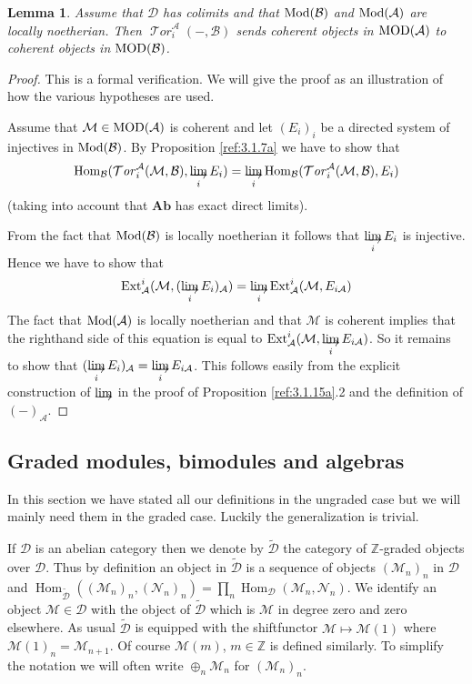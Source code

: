 \documentclass{amsproc}
\def \ZZ{{\mathbb Z}}
\def\Ascr{{\mathcal A}}
\def\Bscr{{\mathcal B}}
\def\Dscr{{\mathcal D}}
\def\Mscr{{\mathcal M}}
\def\Nscr{{\mathcal N}}
\def\Tscr{{\mathcal T}}
\def\HTor{\operatorname {\Tscr \mathit{or}}}
\def\Ab{\mathbf{Ab}}
\def\Mod{\mathop{\text{Mod}}}
\def\MOD{\mathop{\text{MOD}}}
\def\Ext{\operatorname {Ext}}
\def\Hom{\operatorname {Hom}}
\def\HTor{\operatorname {\Tscr \mathit{or}}}
\let\oldtext\text
\def\text#1{\oldtext{\upshape #1}}
\newtheorem{lemmas}{Lemma}[subsection]
\theoremstyle{definition}
\theoremstyle{remark}
\def\dirlim{\mathop{\vtop{\baselineskip -100pt\lineskip -1pt\lineskiplimit 0pt
\setbox0\hbox{\upshape lim}\copy0\hbox to \wd0{\rightarrowfill}}}\limits}
\numberwithin{equation}{section}
\numberwithin{table}{section}
\numberwithin{figure}{section}
\begin{document}
\begin{lemmas}
\label{ref:3.1.17a}
Assume that $\Dscr$ has colimits and that $\Mod(\Bscr)$ and $\Mod(\Ascr)$
are locally noetherian. Then $\HTor_i^\Ascr(-,\Bscr)$ sends coherent
objects in $\MOD(\Ascr)$ to  coherent objects in $\MOD(\Bscr)$.
\end{lemmas}
\begin{proof} This is a formal verification. We will give the proof as an
illustration of how the various hypotheses are used.

Assume that $\Mscr\in\MOD(\Ascr)$ is coherent and let $(E_i)_i$ be a
directed system of injectives in $\Mod(\Bscr)$. By Proposition
\ref{ref:3.1.7a} we have to show that
\[
\Hom_\Bscr(\HTor_i^\Ascr(\Mscr,\Bscr),\dirlim_i E_i)
=
\dirlim_i \Hom_\Bscr(\HTor_i^\Ascr(\Mscr,\Bscr),E_i)
\]
(taking into account that $\Ab$ has exact direct limits). 

From the fact that $\Mod(\Bscr)$ is locally noetherian it follows
that $\dirlim_i E_i$ is injective. Hence we have to show that 
\[
\Ext^i_\Ascr(\Mscr,(\dirlim_i E_i)_\Ascr)=
\dirlim_i \Ext^i_\Ascr(\Mscr,E_{i\Ascr})
\]
The fact that $\Mod(\Ascr)$ is locally noetherian and that $\Mscr$ is
coherent implies that the
righthand side of this equation is equal to 
$ \Ext^i_\Ascr(\Mscr,\dirlim_i E_{i\Ascr})$. So it remains to show that
$(\dirlim_i E_i)_\Ascr=\dirlim_i E_{i\Ascr}$.  This follows easily from
the explicit construction of $\dirlim$ in the proof of Proposition
\ref{ref:3.1.15a}.2 and the definition of $(-)_\Ascr$.
\end{proof}


\subsection{Graded modules, bimodules and algebras}
\label{ref:3.2b}
In this section we have stated all our definitions in the ungraded
case but we will mainly need them in the graded case. Luckily the
generalization is trivial.

If $\Dscr$ is an abelian category then we denote by $\tilde{\Dscr}$
the category of $\ZZ$-graded objects over $\Dscr$. Thus by definition
an object in $\tilde{\Dscr}$ is  a sequence of objects
$(\Mscr_n)_n$ in $\Dscr$ and
$\Hom_{\tilde{\Dscr}}((\Mscr_n)_n,(\Nscr_n)_n)=
\prod_n\Hom_\Dscr(\Mscr_n,\Nscr_n)$.
We identify an object $\Mscr\in\Dscr$ with the object of
$\tilde{\Dscr}$ which is $\Mscr$ in degree zero and zero elsewhere. As
usual $\tilde{\Dscr}$ is equipped with the shiftfunctor $\Mscr\mapsto
\Mscr(1)$ where $\Mscr(1)_n=\Mscr_{n+1}$.
Of course $\Mscr(m)$, $m\in\ZZ$ is defined similarly. To simplify the
notation we will often write $\oplus_n\Mscr_n$ for $(\Mscr_n)_n$.
\end{document}
